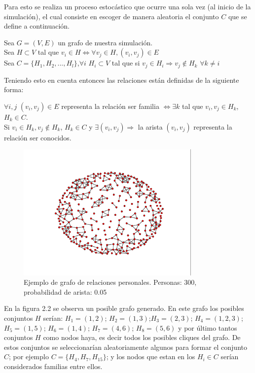 Para esto se realiza un proceso estocástico que ocurre una sola vez (al inicio de la simulación), el cual consiste 
en escoger de manera aleatoria el conjunto $C$ que se define a continuación.
\begin{center}
    Sea $G = (V,E)$ un grafo de nuestra simulación.\\
    Sea $H \subset V$ tal que $v_{i} \in H \Leftrightarrow \forall v_{j} \in H, (v_{i},v_{j}) \in E$\\
    Sea $C = \lbrace H_{1}, H_{2}, ..., H_{l} \rbrace$,$\forall i$ $H_{i} \subset V$ tal que si $v_{j} \in H_{i} \Rightarrow v_{j} \notin H_{k}$ $\forall k \neq i$\\
\end{center}

Teniendo esto en cuenta entonces las relaciones están definidas de la siguiente forma:
\begin{center}
    $\forall i,j$ $(v_{i}, v_{j}) \in E$ representa la relación ser familia  $\Leftrightarrow \exists k$ tal que $v_{i}, v_{j} \in H_{k}$, $H_{k} \in C$.\\
    Si $v_{i} \in H_{k}, v_{j} \notin H_{k}$, $H_{k} \in C$ y $\exists (v_{i}, v_{j}) \Rightarrow$ la arista $(v_{i}, v_{j})$  representa
    la relación ser conocidos.
\end{center}


\begin{figure}[htb]
    \centering
    \includegraphics[width=0.8\textwidth]{Graphics/Grafo_Pers.png}
    \caption{Ejemplo de grafo de relaciones personales. Personas: 300, probabilidad de arista: 0.05}
\end{figure}

En la figura 2.2 se observa un posible grafo generado. En este grafo los posibles conjuntos $H$ serían: 
$H_{1} = (1,2)$; $H_{2}=(1,3)$;$H_{3}=(2,3)$; $H_{4} = (1,2,3)$; $H_{5} = (1,5)$; $H_{6}=(1,4)$; $H_{7} = (4,6)$; $H_{8} = (5,6)$ y por último tantos conjuntos $H$ como nodos haya, es decir
todos los posibles cliques del grafo. De estos conjuntos se seleccionarían aleatoriamente algunos para formar el conjunto $C$;
por ejemplo $C = \lbrace H_{4}, H_{7}, H_{15} \rbrace$; y los nodos que estan en los $H_{i} \in C$ serían considerados
familias entre ellos.\\


